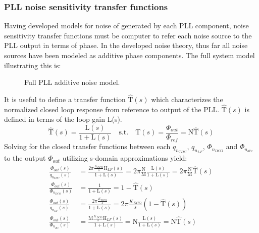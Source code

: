 	\subsubsection{PLL noise sensitivity transfer functions}
		Having developed models for noise of generated by each PLL component, noise sensitivity transfer functions must be computer to refer each noise source to the PLL output in terms of phase. In the developed noise theory, thus far all noise sources have been modeled as additive phase components. The full system model illustrating this is:
		\begin{figure}[htb!]
			\center
			\caption{Full PLL additive noise model.}
			\label{fig:full_pll_noise}
		\end{figure}
		\FloatBarrier
		It is useful to define a transfer function $\hat{\mathrm{T}}(s)$ which characterizes the normalized closed loop response from reference to output of the PLL. $\hat{\mathrm{T}}(s)$ is defined in terms of the loop gain L(s).
		\begin{equation}
		\hat{\mathrm{T}}(s) = \frac{\mathrm{L}(s)}{1+\mathrm{L}(s)}\hspace{1em} \text{s.t.} \hspace{1em} \mathrm{T}(s) = \frac{\Phi_{out}}{\Phi_{ref}} = \mathrm{N}\hat{\mathrm{T}}(s) 
		\end{equation}
		Solving for the closed transfer functions between each $q_{n_{TDC}}$, $q_{n_{LF}}$, $\Phi_{n_{DCO}}$ and $\Phi_{n_{div}}$ to the output $\Phi_{out}$ utilizing s-domain approximations yield:
		\begin{align}
			\frac{\Phi_{out}(s)}{q_{n_{TDC}}(s)} & = \frac{2\pi\frac{K_{DCO}}{s}\mathrm{H}_{LF}(s)}{1+\mathrm{L}(s)}= 2\pi\frac{\mathrm{N}}{\mathrm{M}}\frac{\mathrm{L}(s)}{1+\mathrm{L}(s)} = 2\pi\frac{\mathrm{N}}{\mathrm{M}}\hat{\mathrm{T}}(s)\\
			\frac{\Phi_{out}(s)}{\Phi_{n_{DCO}}(s)} & = \frac{1}{1+\mathrm{L}(s)}= 1-\hat{\mathrm{T}}(s)\\
			\frac{\Phi_{out}(s)}{q_{n_{LF}}(s)} & = \frac{2\pi\frac{K_{DCO}}{s}}{1+\mathrm{L}(s)} = 2\pi\frac{K_{DCO}}{s}(1-\hat{\mathrm{T}}(s))\\
			\frac{\Phi_{out}(s)}{\Phi_{n_{div}}(s)} & = \frac{\mathrm{M}\frac{K_{DCO}}{s}\mathrm{H}_{LF}(s)}{1+\mathrm{L}(s)}= \mathrm{N}\frac{\mathrm{L}(s)}{1+\mathrm{L}(s)} = \mathrm{N}\hat{\mathrm{T}}(s)
		\end{align}


